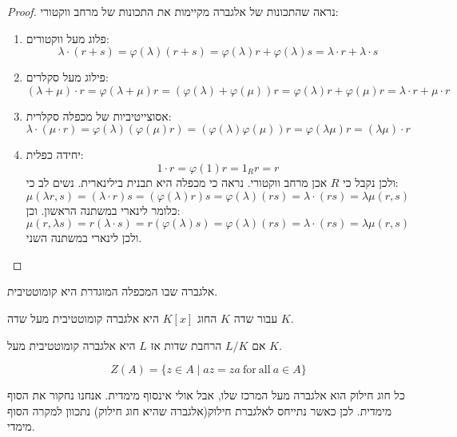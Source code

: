 \documentclass{tstextbook}
\begin{document}
\begin{proof}
נראה שהתכונות של אלגברה מקיימות את התכונות של מרחב ווקטורי:

  \begin{enumerate}
    \item פלוג מעל ווקטורים: 
$$\lambda\cdot(r+s)=\varphi(\lambda)(r+s)=\varphi(\lambda)r+\varphi(\lambda)s=\lambda\cdot r+\lambda\cdot s$$


    \item פילוג מעל סקלרים: 
$$(\lambda+\mu)\cdot r=\varphi(\lambda+\mu)r=(\varphi(\lambda)+\varphi(\mu))r=\varphi(\lambda)r+\varphi(\mu)r=\lambda\cdot r+\mu\cdot r$$


    \item אסוצייטיביות של מכפלה סקלרית: 
$$\lambda\cdot(\mu\cdot r)=\varphi(\lambda)(\varphi(\mu)r)=(\varphi(\lambda)\varphi(\mu))r=\varphi(\lambda\mu)r=(\lambda\mu)\cdot r$$


    \item יחידה כפלית: 
$$1\cdot r=\varphi(1)r=1_{R}r=r$$
ולכן נקבל כי \(R\) אכן מרחב ווקטורי. נראה כי מכפלה היא תבנית בילינארית. נשים לב כי:
$$\mu(\lambda r,s)=(\lambda\cdot r)s=(\varphi(\lambda)r)s=\varphi(\lambda)(r s)=\lambda\cdot(r s)=\lambda\mu(r,s)$$
כלומר לינארי במשתנה הראשון. וכן:
$$\mu(r,\lambda s)=r(\lambda\cdot s)=r(\varphi(\lambda)s)=\varphi(\lambda)(r s)=\lambda\cdot(r s)=\lambda\mu(r,s)$$
ולכן לינארי במשתנה השני.


  \end{enumerate}
\end{proof}
\begin{definition}
אלגברה שבו המכפלה המוגדרת היא קומוטטיבית.

\end{definition}
\begin{example}
עבור שדה \(K\) החוג \(K[x]\) היא אלגברה קומוטטיבית מעל שדה \(K\).

\end{example}
\begin{example}
אם \(L / K\) הרחבת שדות אז \(L\) היא אלגברה קומוטטיבית מעל \(K\).

\end{example}
\begin{definition}
$$Z(A)=\{z\in A\mid a z=z a{\mathrm{~for~all~}}a\in A\}$$

\end{definition}
\begin{remark}
כל חוג חילוק הוא אלגברה מעל המרכז שלו, אבל אולי אינסוף מימדית. אנחנו נחקור את הסוף מימדית. לכן כאשר נתייחס לאלגברת חילוק(אלגברה שהיא חוג חילוק) נתכוון למקרה הסוף מימדי.

\end{remark}
\end{document}
